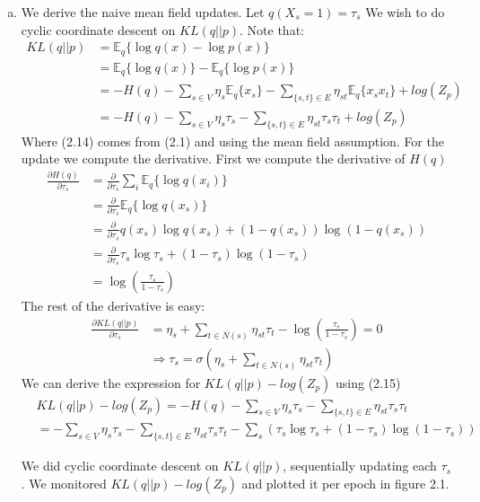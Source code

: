 \documentclass[paper=a4, fontsize=11pt]{scrartcl} %
\numberwithin{equation}{section} %
\numberwithin{figure}{section} %
\numberwithin{table}{section} %
\begin{document}
\begin{enumerate}[(a)]
	
	\item We derive the naive mean field updates. Let $q(X_s=1) = \tau_s$
	We wish to do cyclic coordinate descent on $KL(q||p)$. Note that:
	\begin{align}
	KL(q||p) &= \mathbb{E}_q\{\log q(x)-\log p(x) \}\\
	&= \mathbb{E}_q\{\log q(x)\} - \mathbb{E}_q\{\log p(x)\}\\
	&= - H(q) -  \sum_{s\in V} \eta_s \mathbb{E}_q\{x_s\} - \sum_{\{s,t\}\in E} \eta_{st} \mathbb{E}_q\{x_s x_t\} + log(Z_p)\\
	&= - H(q) -  \sum_{s\in V} \eta_s \tau_s - \sum_{\{s,t\}\in E} \eta_{st} \tau_s\tau_t + log(Z_p)
	\end{align}
	Where (2.14) comes from (2.1) and using the mean field assumption.	For the update we compute the derivative. First we compute the derivative of $H(q)$
	\begin{align}
	\frac{\partial H(q)}{\partial \tau_s} &= \frac{\partial}{\partial \tau_s}\sum_{i}\mathbb{E}_q\{ \log q(x_i) \}\\
	&= \frac{\partial}{\partial \tau_s}\mathbb{E}_q\{ \log q(x_s) \}\\
	&= \frac{\partial}{\partial \tau_s}q(x_s)\log q(x_s) + (1-q(x_s))\log (1 - q(x_s))\\
	&= \frac{\partial}{\partial \tau_s}\tau_s\log \tau_s + (1-\tau_s)\log (1 - \tau_s)\\
	&= \log\left(\frac{\tau_s}{1-\tau_s}\right)
	\end{align}
	The rest of the derivative is easy:
	\begin{align}
	\frac{\partial KL(q||p)}{\partial \tau_s} &= \eta_s + \sum_{t\in N(s)} \eta_{st} \tau_t - \log\left(\frac{\tau_s}{1-\tau_s}\right) = 0\\
	&\Rightarrow \tau_s = \sigma\left( \eta_s + \sum_{t \in N(s)} \eta_{st} \tau_t \right)
	\end{align}
	We can derive the expression for $KL(q||p) - log(Z_p)$ using (2.15)
	\begin{align}
	&KL(q||p) - log(Z_p) = - H(q) -  \sum_{s\in V} \eta_s \tau_s - \sum_{\{s,t\}\in E} \eta_{st} \tau_s\tau_t\\
	&= -\sum_{s\in V} \eta_s \tau_s - \sum_{\{s,t\}\in E} \eta_{st} \tau_s\tau_t - \sum_{s}^{}\left(\tau_s\log \tau_s + (1-\tau_s)\log (1 - \tau_s)\right)
	\end{align}
	
	We did cyclic coordinate descent on $KL(q||p)$, sequentially updating each $\tau_s$. We monitored $KL(q||p) - log(Z_p)$ and plotted it per epoch in figure 2.1.
	

\end{enumerate}
\end{document}
